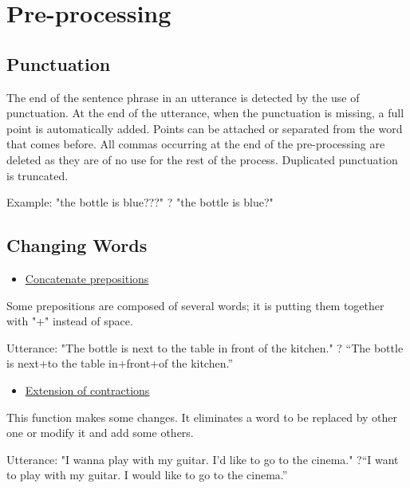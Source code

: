 \documentclass[twoside,a4paper,10pt]{report}
\begin{document}
\section{Pre-processing}
\label{786dd9bb7bc5625a566d42a2962bebf7}%

\subsection{Punctuation}
\label{9ac6d441030eb0844ffb83ba4f100c94}%
The end of the sentence phrase in an utterance is detected by the use of punctuation. At the end of the utterance, when the punctuation is missing, a full point is automatically added. Points can be attached or separated from the word that comes before.
All commas occurring at the end of the pre-processing are deleted as they are of no use for the rest of the process.
Duplicated punctuation is truncated.

Example: "the bottle is blue???" ? "the bottle is blue?"


\subsection{Changing Words}
\label{179d018d9e72e2699a66b97a27313146}%

\begin{itemize}
    \item  \underline{Concatenate prepositions}
\end{itemize}
Some prepositions are composed of several words; it is putting them together with "+" instead of space.


\small
\begin{verbatimtab}
  Utterance: "The bottle is next to the table in front of the kitchen."
  ? “The bottle is next+to the table in+front+of the kitchen.”
\end{verbatimtab}
\normalsize

\begin{itemize}
    \item  \underline{Extension of contractions}
\end{itemize}
This function makes some changes. It eliminates a word to be replaced by other one or modify it and add some others.


\small
\begin{verbatimtab}
  Utterance: "I wanna play with my guitar. I'd like to go to the cinema."
  ?“I want to play with my guitar. I would like to go to the cinema.”
\end{verbatimtab}
\normalsize
\end{document}
